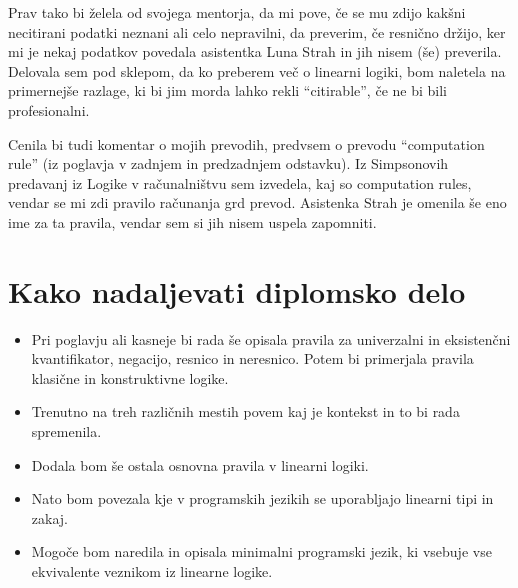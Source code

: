 \documentclass[12pt, titlepage, a4paper]{article}
\begin{document}
Prav tako bi želela od svojega mentorja, da mi pove, če se mu zdijo kakšni necitirani podatki neznani ali celo nepravilni, da preverim, če resnično držijo, ker mi je nekaj podatkov povedala asistentka Luna Strah in jih nisem (še) preverila. Delovala sem pod sklepom, da ko preberem več o linearni logiki, bom naletela na primernejše razlage, ki bi jim morda lahko rekli ``citirable'', če ne bi bili profesionalni.

Cenila bi tudi komentar o mojih prevodih, predvsem o prevodu ``computation rule'' (iz poglavja  v zadnjem in predzadnjem odstavku). Iz Simpsonovih predavanj iz Logike v računalništvu sem izvedela, kaj so computation rules, vendar se mi zdi pravilo računanja grd prevod. Asistenka Strah je omenila še eno ime za ta pravila, vendar sem si jih nisem uspela zapomniti.

\section{Kako nadaljevati diplomsko delo}

\begin{itemize}
  \item Pri poglavju  ali kasneje bi rada še opisala pravila za univerzalni in eksistenčni kvantifikator, negacijo, resnico in neresnico. Potem bi primerjala pravila klasične in konstruktivne logike.
  \item Trenutno na treh različnih mestih povem kaj je kontekst in to bi rada spremenila.
  \item Dodala bom še ostala osnovna pravila v linearni logiki.
  \item Nato bom povezala kje v programskih jezikih se uporabljajo linearni tipi in zakaj.
  \item Mogoče bom naredila in opisala minimalni programski jezik, ki vsebuje vse ekvivalente veznikom iz linearne logike.
  
\end{itemize}


\end{document}
